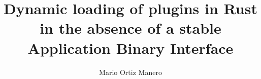 \documentclass[a4paper,12pt,twoside,hidelinks,openright]{book}
\begin{document}
\title{Dynamic loading of plugins in Rust in the absence of a stable Application Binary Interface}
\author{Mario Ortiz Manero}

\pagebreak
\cleardoublepage%
\baselineskip 19pt

\renewcommand{\labelitemi}{$-$}
\renewcommand{\tablename}{Tabla}

\renewcommand{\appendixname}{Anexos}
\renewcommand{\appendixtocname}{Anexos}
\renewcommand{\appendixpagename}{Anexos}



\begingroup
\setlength{\parskip}{\baselineskip}%
\setlength{\parindent}{0pt}%

\newpage
\cleardoublepage%


\newpage
\cleardoublepage%


\newpage
\cleardoublepage%

\endgroup

\newpage
\cleardoublepage%
\renewcommand{\contentsname}{Índice}
\tableofcontents


\setlength{\parskip}{\baselineskip}%
\setlength{\parindent}{0pt}%








\printbibliography%
\nocite{*} %

\newpage
\renewcommand\listfigurename{Lista de Figuras}
\listoffigures

\newpage
\renewcommand\listtablename{Lista de Tablas}
\listoftables


\newpage
\appendix
\clearpage
\addappheadtotoc%
\appendixpage%

\end{document}
